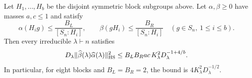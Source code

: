 \begin{theorem}
\label{l:two-sided}
Let $H_1,\ldots,H_b$ be the disjoint symmetric block subgroups
above.  Let $\alpha,\beta\ge0$ have masses $a,c\le1$ and satisfy
\begin{equation}\label{l:two-sided-caps}
 \alpha(H_i g)\le\frac{B_L}{[S_n:H_i]},\qquad
 \beta(gH_i)\le\frac{B_R}{[S_n:H_i]}
       \quad(g\in S_n,\ 1\le i\le b).
\end{equation}
Then every irreducible $\lambda\vdash n$ satisfies
\begin{equation}\label{l:two-sided-bound}
 D_\lambda\|\widehat\beta(\lambda)
                     \widehat\alpha(\lambda)\|_{\mathrm{HS}}^2
 \le B_LB_Rac\,K_\lambda^2D_\lambda^{-1+4/b}.
\end{equation}
In particular, for eight blocks and $B_L=B_R=2$, the bound is
$4K_\lambda^2D_\lambda^{-1/2}$.
\end{theorem}

